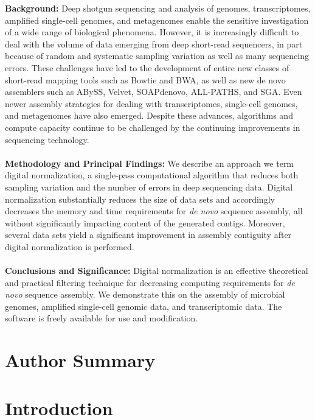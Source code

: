 \documentclass[10pt]{article}
\begin{document}
{\bf Background:} Deep shotgun sequencing and analysis of genomes,
transcriptomes, amplified single-cell genomes, and metagenomes enable
the sensitive investigation of a wide range of biological
phenomena. However, it is increasingly difficult to deal with the volume of data
emerging from deep short-read sequencers, in part because of random
and systematic sampling variation as well as many sequencing errors.
These challenges have led to the development of entire new classes of
short-read mapping tools such as Bowtie and BWA, as well as new de
novo assemblers such as ABySS, Velvet, SOAPdenovo, ALL-PATHS, and SGA.
Even newer assembly strategies for dealing with transcriptomes,
single-cell genomes, and metagenomes have also emerged.  Despite these
advances, algorithms and compute capacity continue to be challenged by
the continuing improvements in sequencing technology.
\\
\\
{\bf Methodology and Principal Findings:} We describe an approach we term
digital normalization, a single-pass computational algorithm that
reduces both sampling variation and the number of errors in deep sequencing data. Digital normalization substantially
reduces the size of data sets and accordingly decreases the memory and time
requirements for {\em de novo} sequence assembly, all without significantly
impacting content of the generated contigs.  Moreover, several data sets
yield a significant improvement in assembly contiguity after digital normalization
is performed.
\\
\\
{\bf Conclusions and Significance:} Digital normalization is an
effective theoretical and practical filtering technique for decreasing computing
requirements for {\em de novo} sequence assembly.  We demonstrate this
on the assembly of microbial genomes, amplified single-cell genomic data,
and transcriptomic data.  The software is freely available for use and
modification.

\section*{Author Summary}

\section*{Introduction}
\end{document}
